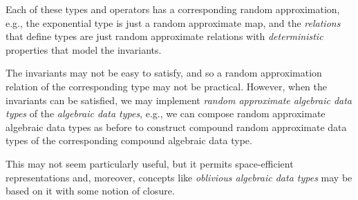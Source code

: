 \documentclass[ ../main.tex]{subfiles}
\begin{document}
Each of these types and operators has a corresponding random approximation, e.g., the exponential type is just a random approximate map, and the \emph{relations} that define types are just random approximate relations with \emph{deterministic} properties that model the invariants.

The invariants may not be easy to satisfy, and so a random approximation relation of the corresponding type may not be practical.
However, when the invariants can be satisfied, we may implement \emph{random approximate algebraic data types} of the \emph{algebraic data types}, e.g., we can compose random approximate algebraic data types as before to construct compound random approximate data types of the corresponding compound algebraic data type.

This may not seem particularly useful, but it permits space-efficient representations and, moreover, concepts like \emph{oblivious algebraic data types} may be based on it with some notion of closure.
\end{document}

